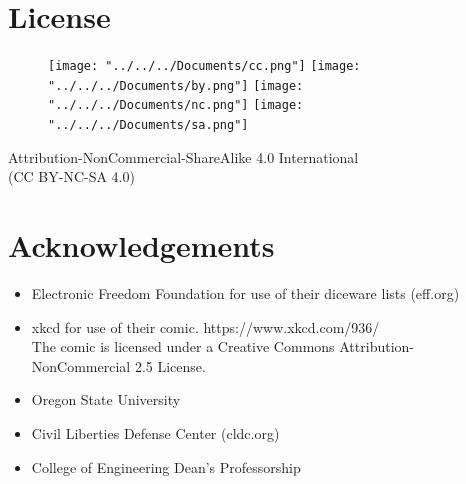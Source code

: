 \documentclass[12pt, oneside]{book}
\begin{document}
	\section*{License}
\begin{figure}[h]
	\centering
	\texttt{[image: "../../../Documents/cc.png"]}
	\texttt{[image: "../../../Documents/by.png"]}
	\texttt{[image: "../../../Documents/nc.png"]}
	\texttt{[image: "../../../Documents/sa.png"]}
\end{figure}
	Attribution-NonCommercial-ShareAlike 4.0 International\\ (CC BY-NC-SA 4.0)
	\section*{Acknowledgements}
	\begin{itemize}
		\item Electronic Freedom Foundation for use of their diceware lists (eff.org)\\
		\item xkcd for use of their comic. https://www.xkcd.com/936/\\
		The comic is licensed under a Creative Commons Attribution-NonCommercial 2.5 License.
		\item Oregon State University\\
		\item Civil Liberties Defense Center (cldc.org)\\
		\item College of Engineering Dean's Professorship\\
	\end{itemize}
	
\end{document}
